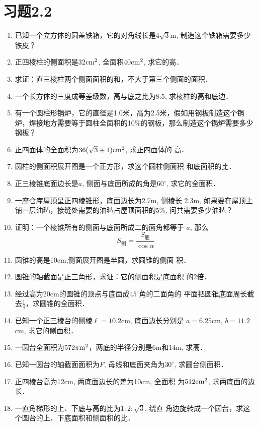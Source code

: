 \section*{习题2.2}

\begin{enumerate}
\item 已知一个立方体的圆盖铁箱，它的对角线长是$4\sqrt{3}$m, 制造这个铁箱需要多少铁皮？
\item 正四棱柱的侧面积是32${\rm cm^2}$, 全面积40${\rm cm^2}$, 求它的高．    
\item 求证：直三棱柱两个侧面面积的和，不大于第三个侧面的面积．
\item 一个长方体的三度成等差级数，高与底之比为8:5, 
求棱柱的高和底边．
\item 有一个圆柱形锅炉，它的直径是1.0米，高为2.5米，假如用钢板制造这个锅炉，焊接地方需要等于圆柱全面积的10\%的钢板，那么制造这个锅炉需要多少钢板？
\item 正四面体的全面积为$36(\sqrt{3}+1){\rm cm^2}$, 求正四面体的
高．
\item 圆柱的侧面积展开图是一个正方形，求这个圆柱侧面积
和底面积的比．
\item 正三棱锥底面边长是$a$, 侧面与底面所成的角是$60^{\circ}$, 
求它的全面积．
\item 一座仓库屋顶呈正四棱锥形，底面边长为2.7m, 侧棱长
2.3m, 如果要在屋顶上铺一层油毡，接缝处需要的油毡占屋顶面积的5\%, 问共需要多少油毡？
\item 证明：一个棱锥所有的侧面与底面所成二的面角都等于
$a$, 那么
\[S_{\text{侧}}=\frac{S_{\text{底}}}{\cos\alpha}\]
\item 圆锥的高是10cm,侧面展开图是半圆，求圆锥的侧面
积．
\item 圆锥的轴截面是正三角形，求证：它的侧面积是底面积
的2倍．
\item 经过高为20cm的圆锥的顶点与底面成$45^{\circ}$角的二面角的
平面把圆锥底面周长截去$\frac{1}{4}$，求圆锥的全面积．
\item 已知一个正三棱台的侧棱$\ell=10.2$cm, 底面边长分别是
$a=6.25$cm, $b=11.2$cm, 求它的侧面积．
\item 一圆台全面积为$572\pi {\rm m^2}$，两底的半径分别是6m和14m, 
求高．
\item 已知一圆台的轴截面面积为$F$, 母线和底面夹角为$30^{\circ}$, 
求圆台侧面积．
\item 正四棱台高为12cm, 两底面边长的差为10cm, 全面积
为$512{\rm cm^2}$, 求两底面的边长．
\item 一直角梯形的上、下底与高的比为$1:2:\sqrt{3}$, 绕直
角边旋转成一个圆台，求这个圆台的上、下底面积和侧面积的比．

\end{enumerate}
